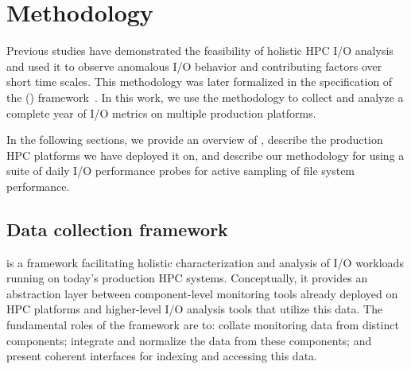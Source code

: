\section{Methodology}\label{sec:methods}

Previous studies have demonstrated the feasibility of 
holistic HPC I/O analysis and used it to observe anomalous I/O behavior and
contributing factors over short time scales\cite{Lockwood2017}. This methodology was later formalized in the specification of the \tokio (\tokiolong) framework~\cite{Lockwood2018tokio}. 
In this work, we use the \tokio methodology to collect and analyze a complete
year of I/O metrics on multiple production platforms.

In the following sections, we provide an overview of \tokio, describe the production HPC platforms we have deployed it on, and describe our methodology for using a suite of daily I/O performance probes for active sampling of file system performance.

\subsection{Data collection framework}\label{sec:methods/tokio}


\tokio is a framework facilitating holistic characterization and analysis of I/O workloads running on today's production HPC systems. Conceptually, it provides an abstraction layer between component-level monitoring tools already deployed on HPC platforms and higher-level I/O analysis tools that utilize this data. The fundamental roles of the \tokio framework are to: collate monitoring data from distinct components; integrate and normalize the data from these components; and present coherent interfaces for indexing and accessing this data.

